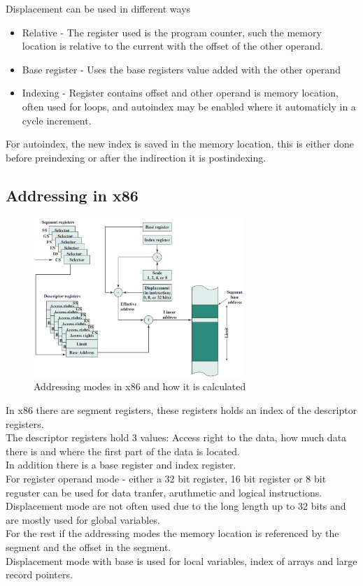 \documentclass[12pt, a4paper]{article}
\begin{document}
			Displacement can be used in different ways
			\begin{itemize}
				\item Relative - The register used is the program counter, such the memory location is relative to the current with the offset of the other operand.
				\item Base register - Uses the base registers value added with the other operand
				\item Indexing - Register contains offset and other operand is memory location, often used for loops, and autoindex may be enabled where it automaticly in a cycle increment.
			\end{itemize}
			 For autoindex, the new index is saved in the memory location, this is either done before preindexing or after the indirection it is postindexing.
		\subsection{Addressing in x86}
			\begin{figure}[h!]
				\centering
				\includegraphics[width=300px]{assets/addressingModesCalculation.png}
				\caption{Addressing modes in x86 and how it is calculated}
			\end{figure}
			In x86 there are segment registers, these registers holds an index of the descriptor registers.\\
			The descriptor registers hold 3 values: Access right to the data, how much data there is and where the first part of the data is located.\\
			In addition there is a base register and index register.\\
			For register operand mode - either a 32 bit register, 16 bit register or 8 bit reguster can be used for data tranfer, aruthmetic and logical instructions.\\
			Displacement mode are not often used due to the long length up to 32 bits and are mostly used for global variables.\\
			For the rest if the addressing modes the memory location is referenced by the segment and the offset in the segment.\\
			Displacement mode with base is used for local variables, index of arrays and large record pointers.\\
\end{document}
